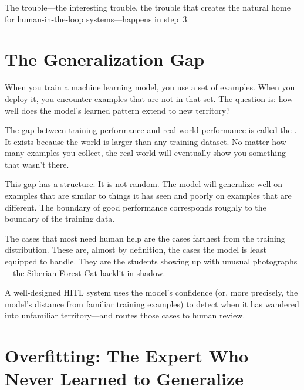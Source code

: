 The trouble---the interesting trouble, the trouble that creates the natural home for human-in-the-loop systems---happens in step~3.

\section{The Generalization Gap}

When you train a machine learning model, you use a set of examples. When you deploy it, you encounter examples that are not in that set. The question is: how well does the model's learned pattern extend to new territory?

The gap between training performance and real-world performance is called the . It exists because the world is larger than any training dataset. No matter how many examples you collect, the real world will eventually show you something that wasn't there.

This gap has a structure. It is not random. The model will generalize well on examples that are similar to things it has seen and poorly on examples that are different. The boundary of good performance corresponds roughly to the boundary of the training data.

\begin{keyconcept}
The cases that most need human help are the cases farthest from the training distribution. These are, almost by definition, the cases the model is least equipped to handle. They are the students showing up with unusual photographs---the Siberian Forest Cat backlit in shadow.

A well-designed HITL system uses the model's confidence (or, more precisely, the model's distance from familiar training examples) to detect when it has wandered into unfamiliar territory---and routes those cases to human review.
\end{keyconcept}

\section{Overfitting: The Expert Who Never Learned to Generalize}

